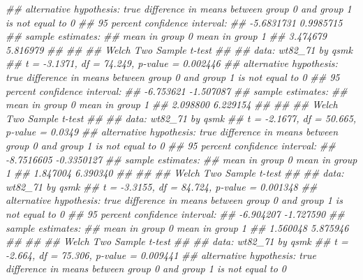\documentclass[
  10pt,
  a4paper,
]{book}
\newenvironment{Shaded}{\begin{snugshade}}{\end{snugshade}}
\newcommand{\DocumentationTok}[1]{\textcolor[rgb]{0.37,0.37,0.37}{\textit{#1}}}
\begin{document}
\begin{Shaded}
\begin{Highlighting}[]
\DocumentationTok{\#\# alternative hypothesis: true difference in means between group 0 and group 1 is not equal to 0}
\DocumentationTok{\#\# 95 percent confidence interval:}
\DocumentationTok{\#\#  {-}5.6831731  0.9985715}
\DocumentationTok{\#\# sample estimates:}
\DocumentationTok{\#\# mean in group 0 mean in group 1 }
\DocumentationTok{\#\#        3.474679        5.816979 }
\DocumentationTok{\#\# }
\DocumentationTok{\#\# }
\DocumentationTok{\#\#  Welch Two Sample t{-}test}
\DocumentationTok{\#\# }
\DocumentationTok{\#\# data:  wt82\_71 by qsmk}
\DocumentationTok{\#\# t = {-}3.1371, df = 74.249, p{-}value = 0.002446}
\DocumentationTok{\#\# alternative hypothesis: true difference in means between group 0 and group 1 is not equal to 0}
\DocumentationTok{\#\# 95 percent confidence interval:}
\DocumentationTok{\#\#  {-}6.753621 {-}1.507087}
\DocumentationTok{\#\# sample estimates:}
\DocumentationTok{\#\# mean in group 0 mean in group 1 }
\DocumentationTok{\#\#        2.098800        6.229154 }
\DocumentationTok{\#\# }
\DocumentationTok{\#\# }
\DocumentationTok{\#\#  Welch Two Sample t{-}test}
\DocumentationTok{\#\# }
\DocumentationTok{\#\# data:  wt82\_71 by qsmk}
\DocumentationTok{\#\# t = {-}2.1677, df = 50.665, p{-}value = 0.0349}
\DocumentationTok{\#\# alternative hypothesis: true difference in means between group 0 and group 1 is not equal to 0}
\DocumentationTok{\#\# 95 percent confidence interval:}
\DocumentationTok{\#\#  {-}8.7516605 {-}0.3350127}
\DocumentationTok{\#\# sample estimates:}
\DocumentationTok{\#\# mean in group 0 mean in group 1 }
\DocumentationTok{\#\#        1.847004        6.390340 }
\DocumentationTok{\#\# }
\DocumentationTok{\#\# }
\DocumentationTok{\#\#  Welch Two Sample t{-}test}
\DocumentationTok{\#\# }
\DocumentationTok{\#\# data:  wt82\_71 by qsmk}
\DocumentationTok{\#\# t = {-}3.3155, df = 84.724, p{-}value = 0.001348}
\DocumentationTok{\#\# alternative hypothesis: true difference in means between group 0 and group 1 is not equal to 0}
\DocumentationTok{\#\# 95 percent confidence interval:}
\DocumentationTok{\#\#  {-}6.904207 {-}1.727590}
\DocumentationTok{\#\# sample estimates:}
\DocumentationTok{\#\# mean in group 0 mean in group 1 }
\DocumentationTok{\#\#        1.560048        5.875946 }
\DocumentationTok{\#\# }
\DocumentationTok{\#\# }
\DocumentationTok{\#\#  Welch Two Sample t{-}test}
\DocumentationTok{\#\# }
\DocumentationTok{\#\# data:  wt82\_71 by qsmk}
\DocumentationTok{\#\# t = {-}2.664, df = 75.306, p{-}value = 0.009441}
\DocumentationTok{\#\# alternative hypothesis: true difference in means between group 0 and group 1 is not equal to 0}

\end{Highlighting}
\end{Shaded}
\end{document}
